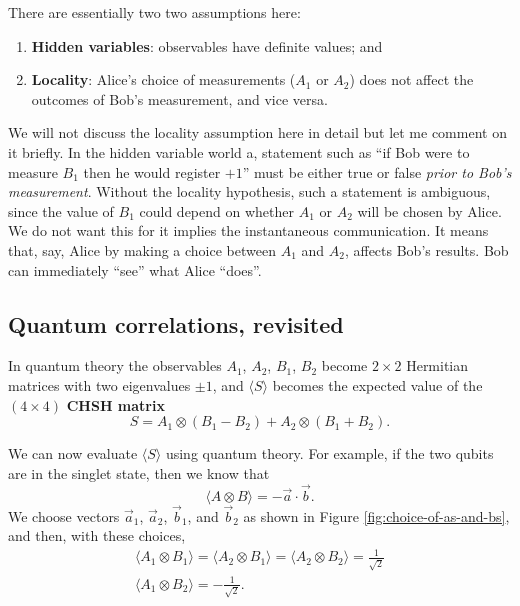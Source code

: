 \documentclass[fleqn]{article}
\providecommand{\tightlist}{%
  \setlength{\itemsep}{0pt}\setlength{\parskip}{0pt}}
\begin{document}
There are essentially two two assumptions here:

\begin{enumerate}
\def\labelenumi{\arabic{enumi}.}
\tightlist
\item
  \textbf{Hidden variables}: observables have definite values; and
\item
  \textbf{Locality}: Alice's choice of measurements (\(A_1\) or \(A_2\)) does not affect the outcomes of Bob's measurement, and vice versa.
\end{enumerate}

We will not discuss the locality assumption here in detail but let me comment on it briefly.
In the hidden variable world a, statement such as ``if Bob were to measure \(B_1\) then he would register \(+1\)'' must be either true or false \emph{prior to Bob's measurement}.
Without the locality hypothesis, such a statement is ambiguous, since the value of \(B_1\) could depend on whether \(A_1\) or \(A_2\) will be chosen by Alice.
We do not want this for it implies the instantaneous communication.
It means that, say, Alice by making a choice between \(A_1\) and \(A_2\), affects Bob's results.
Bob can immediately ``see'' what Alice ``does''.

\hypertarget{quantum-correlations-revisited}{%
\subsection{Quantum correlations, revisited}\label{quantum-correlations-revisited}}

In quantum theory the observables \(A_1\), \(A_2\), \(B_1\), \(B_2\) become \(2\times 2\) Hermitian matrices with two eigenvalues \(\pm 1\), and \(\langle S\rangle\) becomes the expected value of the \((4\times 4)\) \textbf{CHSH matrix}
\[
  S
  = A_1\otimes(B_1-B_2) + A_2\otimes(B_1+B_2).
\]

We can now evaluate \(\langle S\rangle\) using quantum theory.
For example, if the two qubits are in the singlet state, then we know that
\[
  \langle A\otimes B\rangle = -\vec{a}\cdot\vec{b}.
\]
We choose vectors \(\vec{a}_1\), \(\vec{a}_2\), \(\vec{b}_1\), and \(\vec{b}_2\) as shown in Figure \ref{fig:choice-of-as-and-bs}, and then, with these choices,
\[
\begin{gathered}
  \langle A_1\otimes B_1\rangle
  = \langle A_2\otimes B_1\rangle
  = \langle A_2\otimes B_2\rangle
  = \frac{1}{\sqrt 2}
\\\langle A_1\otimes B_2\rangle
   = -\frac{1}{\sqrt 2}.
\end{gathered}
\]
\end{document}
